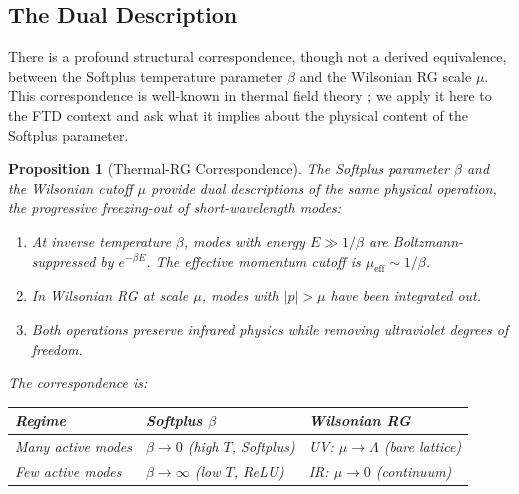 \documentclass[12pt]{article}
\newtheorem{proposition}[theorem]{Proposition}
\theoremstyle{definition}
\theoremstyle{remark}
\begin{document}
\subsection{The Dual Description}

There is a profound structural correspondence, though not a derived equivalence, between the Softplus temperature parameter $\beta$ and the Wilsonian RG scale $\mu$. This correspondence is well-known in thermal field theory \cite{Kapusta2006}; we apply it here to the FTD context and ask what it implies about the physical content of the Softplus parameter.

\begin{proposition}[Thermal-RG Correspondence]
\label{prop:rg}
The Softplus parameter $\beta$ and the Wilsonian cutoff $\mu$ provide dual descriptions of the same physical operation, the progressive freezing-out of short-wavelength modes:
\begin{enumerate}[noitemsep]
    \item At inverse temperature $\beta$, modes with energy $E \gg 1/\beta$ are Boltzmann-suppressed by $e^{-\beta E}$. The effective momentum cutoff is $\mu_{\text{eff}} \sim 1/\beta$.
    \item In Wilsonian RG at scale $\mu$, modes with $|p| > \mu$ have been integrated out.
    \item Both operations preserve infrared physics while removing ultraviolet degrees of freedom.
\end{enumerate}
The correspondence is:
\begin{center}
\renewcommand{\arraystretch}{1.3}
\begin{tabular}{lll}
\toprule
\textbf{Regime} & \textbf{Softplus $\beta$} & \textbf{Wilsonian RG} \\
\midrule
Many active modes & $\beta \to 0$ (high $T$, Softplus) & UV: $\mu \to \Lambda$ (bare lattice) \\
Few active modes & $\beta \to \infty$ (low $T$, ReLU) & IR: $\mu \to 0$ (continuum) \\
\bottomrule
\end{tabular}
\end{center}
\end{proposition}
\end{document}
